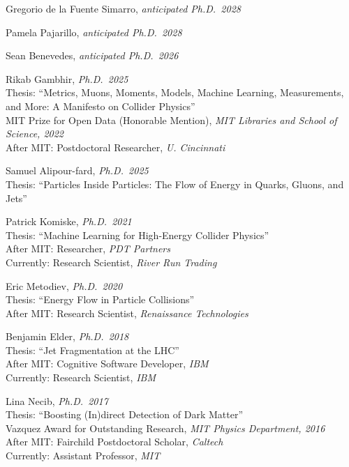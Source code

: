\bbl

\item Gregorio de la Fuente Simarro, \emph{anticipated Ph.D.~2028}

\item Pamela Pajarillo, \emph{anticipated Ph.D.~2028}

\item Sean Benevedes, \emph{anticipated Ph.D.~2026}

\item Rikab Gambhir, \emph{Ph.D.~2025}
\\ Thesis: ``Metrics, Muons, Moments, Models, Machine Learning, Measurements, and More: A Manifesto on Collider Physics''
\\ MIT Prize for Open Data (Honorable Mention), \emph{MIT Libraries and School of Science, 2022}
\\ After MIT: Postdoctoral Researcher, \emph{U. Cincinnati}

\item Samuel Alipour-fard, \emph{Ph.D.~2025}
\\ Thesis: ``Particles Inside Particles: The Flow of Energy in Quarks, Gluons, and Jets''

\item Patrick Komiske, \emph{Ph.D.~2021}
\\ Thesis: ``Machine Learning for High-Energy Collider Physics''
\\ After MIT: Researcher, \emph{PDT Partners}
\\ Currently: Research Scientist, \emph{River Run Trading}

\item Eric Metodiev, \emph{Ph.D.~2020}
\\ Thesis: ``Energy Flow in Particle Collisions''
\\ After MIT: Research Scientist, \emph{Renaissance Technologies}

\item Benjamin Elder, \emph{Ph.D.~2018}
\\ Thesis: ``Jet Fragmentation at the LHC''
\\ After MIT: Cognitive Software Developer, \emph{IBM}
\\ Currently: Research Scientist, \emph{IBM}

\item Lina Necib, \emph{Ph.D.~2017}
\\ Thesis: ``Boosting (In)direct Detection of Dark Matter''
\\ Vazquez Award for Outstanding Research, \emph{MIT Physics Department, 2016}
\\ After MIT: Fairchild Postdoctoral Scholar, \emph{Caltech}
\\ Currently: Assistant Professor, \emph{MIT}

